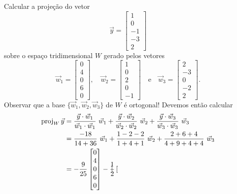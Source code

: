 \begin{ex}
Calcular a projeção do vetor
\begin{equation}
\vec{y} =
\begin{bmatrix}
1 \\ 0 \\ -1 \\ -3 \\ 2
\end{bmatrix}
\end{equation} sobre o espaço tridimensional $W$ gerado pelos vetores
\begin{equation}
\vec{w}_1 =
\begin{bmatrix}
 0\\4\\0 \\ 6 \\0
\end{bmatrix}, \quad
\vec{w}_2 =
\begin{bmatrix}
 1\\0\\2\\0\\-1
\end{bmatrix} \quad \text{e} \quad
\vec{w}_3 =
\begin{bmatrix}
 2\\-3\\0\\-2\\ 2
\end{bmatrix}.
\end{equation} Observar que a base $\{\vec{w}_1, \vec{w}_2, \vec{w}_3\}$ de $W$ é ortogonal! Devemos então calcular
  \begin{align*}
\proj_W \vec{y} & = \frac{\vec{y} \cdot \vec{w}_1}{\vec{w}_1 \cdot \vec{w}_1} \ \vec{w}_1 + \frac{\vec{y} \cdot \vec{w}_2}{\vec{w}_2 \cdot \vec{w}_2} \ \vec{w}_2 + \frac{\vec{y} \cdot \vec{w}_3}{\vec{w}_3 \cdot \vec{w}_3} \ \vec{w}_3\\
                & = \frac{ -18 }{ 14 + 36 } \ \vec{w}_1 + \frac{ 1 - 2 - 2 }{ 1 + 4 + 1 } \ \vec{w}_2 + \frac{ 2 + 6 + 4 }{ 4 + 9 + 4 + 4 } \ \vec{w}_3 \\
                & = -\frac{9}{25} \begin{bmatrix}
 0\\4\\0 \\ 6 \\0
\end{bmatrix} - \frac{1}{2} \begin{bmatrix}

\end{bmatrix}
\end{align*}
\end{ex}
